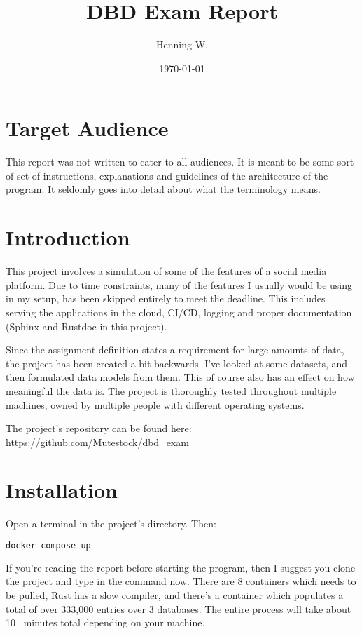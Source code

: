 \documentclass[a4paper, 12pt]{article}
\begin{document}
\title{\Large{\textbf{DBD Exam Report}}}
\author{Henning W.}
\date{\today}
\maketitle
\fancyhf{}
\renewcommand{\headrulewidth}{2pt}
\renewcommand{\headrulewidth}{2pt}
\fancyhead{\leftmark}
\fancyfoot{\thepage}

\section{Target Audience}
This report was not written to cater to all audiences. It is meant to be some sort of set of instructions, explanations and guidelines of the architecture of the program. It seldomly goes into detail about what the terminology means.  

\section{Introduction}
This project involves a simulation of some of the features of a social media platform. Due to time constraints, many of the features I usually would be using in my setup, has been skipped entirely to meet the deadline. This includes serving the applications in the cloud, CI/CD, logging and proper documentation (Sphinx and Rustdoc in this project).

Since the assignment definition states a requirement for large amounts of data, the project has been created a bit backwards. I've looked at some datasets, and then formulated data models from them. This of course also has an effect on how meaningful the data is. The project is thoroughly tested throughout multiple machines, owned by multiple people with different operating systems. 

The project's repository can be found here: 
\url{https://github.com/Mutestock/dbd\_exam}

\section{Installation}
Open a terminal in the project's directory. Then:

\begin{lstlisting}[language=Rust]
docker-compose up
\end{lstlisting}

If you're reading the report before starting the program, then I suggest you clone the project and type in the command now. There are 8 containers which needs to be pulled, Rust has a slow compiler, and there's a container which populates a total of over 333,000 entries over 3 databases. The entire process will take about 10~ minutes total depending on your machine. 
\end{document}
